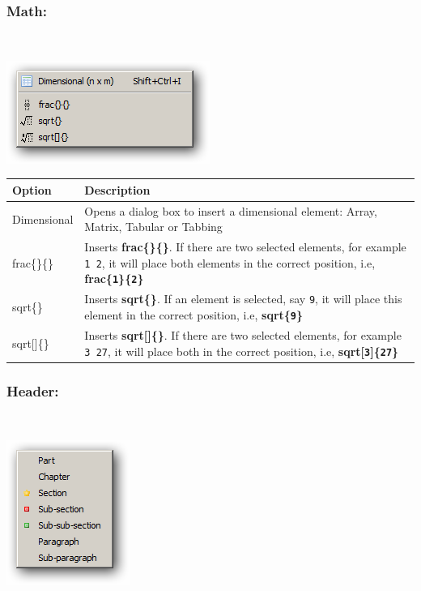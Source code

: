 \hypertarget{menu_insert_latex_math}{}
\subsubsection{Math:}\\

\includegraphics[scale=0.50]{./res/menu_insert_latex_math.png}\\

\begin{scriptsize}\begin{tabularx}{\textwidth}{>{\hsize=0.2\hsize}X>{\hsize=0.8\hsize}X}\\
    \hline \textbf{Option} & \textbf{Description} \\
    \hline
    Dimensional & Opens a dialog box to insert a dimensional element: Array, Matrix, Tabular or Tabbing \\
    \hline
    frac\{\}\{\} & Inserts \textbf{frac\{\}\{\}}. If there are two selected elements, for example \texttt{1 2}, it will place both elements in the correct position, i.e, \textbf{frac\{\texttt{1}\}\{\texttt{2}\}} \\
    sqrt\{\} & Inserts \textbf{sqrt\{\}}. If an element is selected, say \texttt{9}, it will place this element in the correct position, i.e, \textbf{sqrt\{\texttt{9}\}} \\
    sqrt[]\{\} & Inserts \textbf{sqrt[]\{\}}. If there are two selected elements, for example \texttt{3 27}, it will place both in the correct position, i.e, \textbf{sqrt[\texttt{3}]\{\texttt{27}\}} \\
    \hline
  \end{tabularx}\end{scriptsize}


\hypertarget{menu_insert_latex_header}{}
\subsubsection{Header:}\\

\includegraphics[scale=0.50]{./res/menu_insert_latex_header.png}\\

